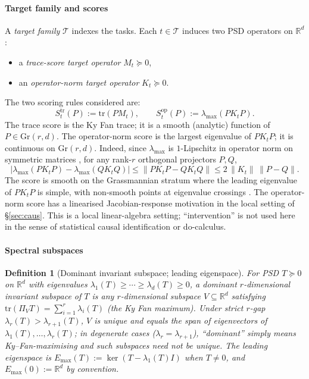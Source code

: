 \documentclass[final,3p,times]{elsarticle}
\newtheorem{definition}[theorem]{Definition}
\newcommand{\Gr}{\mathrm{Gr}}
\newcommand{\tr}{\mathrm{tr}}
\newcommand{\R}{\mathbb{R}}
\newcommand{\Emax}{E_{\max}}
\begin{document}
\paragraph{Target family and scores}
A \emph{target family} $\mathcal{T}$ indexes the tasks.
Each $t\in\mathcal{T}$ induces two PSD operators on $\R^d$:
\begin{itemize}
\item a \emph{trace-score target operator} $M_t\succeq 0$,
\item an \emph{operator-norm target operator} $K_t\succeq 0$.
\end{itemize}
The two scoring rules considered are:
\begin{equation}\label{eq:scores}
S^{\mathrm{tr}}_t(P) := \tr(P M_t),
\qquad
S^{\mathrm{op}}_t(P) := \lambda_{\max}(P K_t P).
\end{equation}
The trace score is the Ky Fan trace; it is a smooth (analytic) function
of $P\in\Gr(r,d)$.
The operator-norm score is the largest eigenvalue of $PK_tP$; it is
continuous on $\Gr(r,d)$.
Indeed, since $\lambda_{\max}$ is $1$-Lipschitz in operator norm on
symmetric matrices \cite{HornJohnson2013}, for any rank-$r$ orthogonal
projectors $P,Q$,
\begin{equation}\label{eq:opnormcont}
|\lambda_{\max}(PK_tP)-\lambda_{\max}(QK_tQ)|
\le\|PK_tP-QK_tQ\|
\le 2\,\|K_t\|\,\|P-Q\|.
\end{equation}
The score is smooth on the Grassmannian stratum where the leading
eigenvalue of $PK_tP$ is simple, with non-smooth points at eigenvalue
crossings \cite{HornJohnson2013}.
The operator-norm score has a linearised Jacobian-response motivation
in the local setting of \S\ref{sec:caus}.
This is a local linear-algebra setting; ``intervention'' is not used
here in the sense of statistical causal identification or do-calculus.

\paragraph{Spectral subspaces}
\begin{definition}[Dominant invariant subspace; leading eigenspace]
\label{def:domsubspace}
For PSD $T\succeq 0$ on $\R^d$ with eigenvalues
$\lambda_1(T)\ge\cdots\ge\lambda_d(T)\ge 0$, a \emph{dominant
$r$-dimensional invariant subspace} of $T$ is any $r$-dimensional
subspace $V\subseteq\R^d$ satisfying
$\tr(\Pi_V T)=\sum_{i=1}^r\lambda_i(T)$ (the Ky Fan maximum).
Under strict $r$-gap $\lambda_r(T)>\lambda_{r+1}(T)$, $V$ is unique and
equals the span of eigenvectors of $\lambda_1(T),\ldots,\lambda_r(T)$;
in degenerate cases ($\lambda_r=\lambda_{r+1}$), ``dominant'' simply
means Ky--Fan-maximising and such subspaces need not be unique.
The \emph{leading eigenspace} is
$\Emax(T):=\ker(T-\lambda_1(T)I)$ when $T\ne 0$, and
$\Emax(0):=\R^d$ by convention.
\end{definition}
\end{document}
